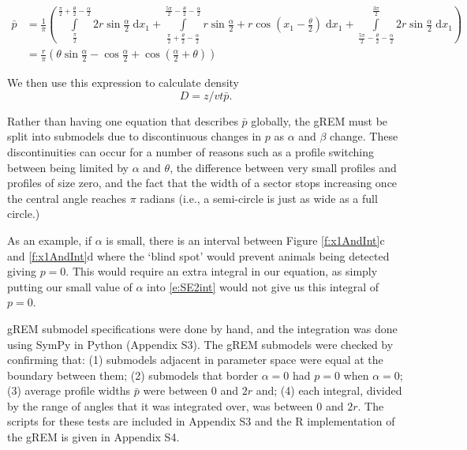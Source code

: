 \documentclass[a4paper,10pt,reqno,oneside]{amsart}
\begin{document}
\begin{align}
    \bar{p} &=\frac{1}{\pi} \left(\int\limits_{\frac{\pi}{2}}^{\frac{\pi}{2} + \frac{\theta}{2} - \frac{\alpha}{2}}2 r \sin{\frac{\alpha}{2} }\;\mathrm{d}x_1+\int\limits_{\frac{\pi}{2} + \frac{\theta}{2} - \frac{\alpha}{2}}^{\frac{5 \pi}{2} - \frac{\theta}{2} - \frac{\alpha}{2}}r \sin{\frac{\alpha}{2} } + r \cos{\left (x_1 - \frac{\theta}{2} \right )}\;\mathrm{d}x_1+\int\limits_{\frac{5 \pi}{2} - \frac{\theta}{2} - \frac{\alpha}{2}}^{\frac{3 \pi}{2}}2 r \sin{\frac{\alpha}{2} }\;\mathrm{d}x_1\right) \label{e:SE2int}  \\
     &= \frac{r}{\pi} \left(\theta \sin{\frac{\alpha}{2} } - \cos{\frac{\alpha}{2} } + \cos{\left (\frac{\alpha}{2} + \theta \right )}\right) \label{e:SE2result}
\end{align}

We then use this expression to calculate density
\begin{equation}
\label{e:gas}
D = z/vt\bar{p}.
\end{equation}


Rather than having one equation that describes $\bar{p}$ globally, the gREM must be split into submodels due to discontinuous changes in $p$ as $\alpha$ and $\beta$ change. These discontinuities can occur for a number of reasons such as a profile switching between being limited by $\alpha$ and $\theta$, the difference between very small profiles and profiles of size zero, and the fact that the width of a sector stops increasing once the central angle reaches $\pi$ radians (i.e., a semi-circle is just as wide as a full circle.)

As an example, if $\alpha$ is small, there is an interval between Figure \ref{f:x1AndInt}c and \ref{f:x1AndInt}d where the `blind spot' would prevent animals being detected giving $p=0$. This would require an extra integral in our equation, as simply putting our small value of $\alpha$ into \ref{e:SE2int} would not give us this integral of $p=0$.

gREM submodel specifications were done by hand, and the integration was done using SymPy \citep{sympy} in Python (Appendix S3). The gREM submodels were checked by confirming that: (1) submodels adjacent in parameter space were equal at the boundary between them; (2) submodels that border $ \alpha = 0$ had $p = 0$ when $ \alpha = 0$; (3) average profile widths $\bar{p}$ were between 0 and $2r$ and; (4) each integral, divided by the range of angles that it was integrated over, was between 0 and $2r$. The scripts for these tests are included in Appendix S3 and the R \citep{R} implementation of the gREM is given in Appendix S4.  
\end{document}
